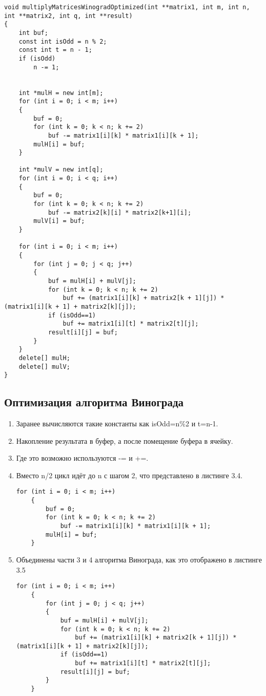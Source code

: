 \begin{lstlisting}[caption= Улучшенный алгоритм матриц Винограда]
void multiplyMatricesWinogradOptimized(int **matrix1, int m, int n, int **matrix2, int q, int **result)
{
	int buf;
	const int isOdd = n % 2;
	const int t = n - 1;
	if (isOdd)
		n -= 1;
	
	
	int *mulH = new int[m];
	for (int i = 0; i < m; i++)
	{
		buf = 0;
		for (int k = 0; k < n; k += 2)
			buf -= matrix1[i][k] * matrix1[i][k + 1];
		mulH[i] = buf;
	}
	
	int *mulV = new int[q];
	for (int i = 0; i < q; i++)
	{
		buf = 0;
		for (int k = 0; k < n; k += 2)
			buf -= matrix2[k][i] * matrix2[k+1][i];
		mulV[i] = buf;
	}
	
	for (int i = 0; i < m; i++)
	{
		for (int j = 0; j < q; j++)
		{
			buf = mulH[i] + mulV[j];
			for (int k = 0; k < n; k += 2)
				buf += (matrix1[i][k] + matrix2[k + 1][j]) * (matrix1[i][k + 1] + matrix2[k][j]);
			if (isOdd==1)
				buf += matrix1[i][t] * matrix2[t][j];
			result[i][j] = buf;
		}
	}
	delete[] mulH;
	delete[] mulV;  
}
\end{lstlisting}

\subsection{Оптимизация алгоритма Винограда}
\begin{enumerate}[1.]
	\item Заранее вычисляются такие константы как isOdd=n\%2 и t=n-1.
	\item Накопление результата в буфер, а после помещение буфера в ячейку.
	\item Где это возможно используются -= и +=.
	\item Вместо n/2 цикл идёт до n с шагом 2, что представлено в листинге 3.4.
	\begin{lstlisting}[caption=Оптимизации алгоритма Винограда \textnumero 2--4]
	for (int i = 0; i < m; i++)
	{
		buf = 0;
		for (int k = 0; k < n; k += 2)
			buf -= matrix1[i][k] * matrix1[i][k + 1];
		mulH[i] = buf;
	}
	\end{lstlisting}
	\item Объединены части 3 и 4 алгоритма Винограда, как это отображено в листинге 3.5
	\begin{lstlisting}[caption=Оптимизация алгоритма Винограда \textnumero 5]
	for (int i = 0; i < m; i++)
	{
		for (int j = 0; j < q; j++)
		{
			buf = mulH[i] + mulV[j];
			for (int k = 0; k < n; k += 2)
				buf += (matrix1[i][k] + matrix2[k + 1][j]) * (matrix1[i][k + 1] + matrix2[k][j]);
			if (isOdd==1)
				buf += matrix1[i][t] * matrix2[t][j];
			result[i][j] = buf;
		}
	}
	\end{lstlisting}
\end{enumerate}
